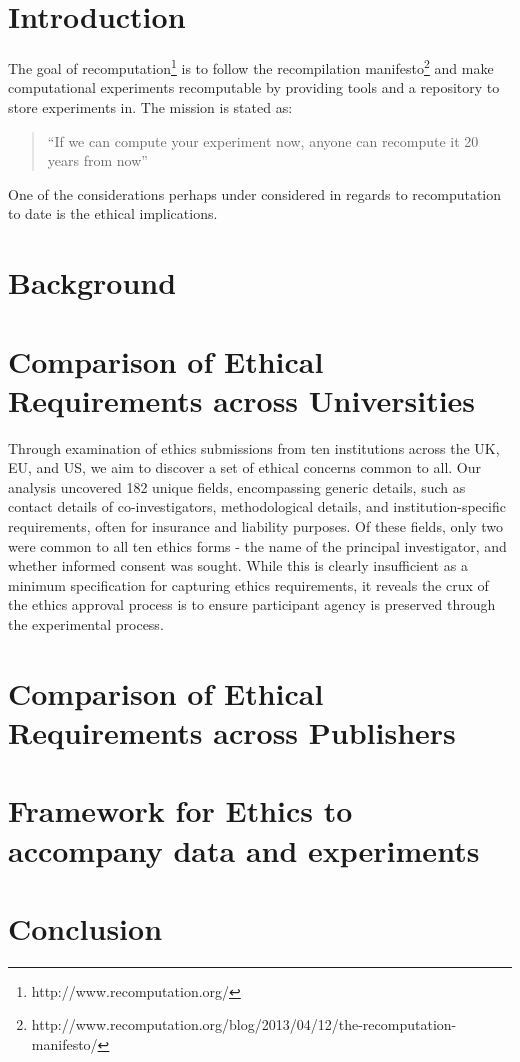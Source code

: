 \documentclass[12pt]{article}
\begin{document}
\maketitle

\section{Introduction}
The goal of recomputation\footnote{http://www.recomputation.org/} is to follow the recompilation manifesto\footnote{http://www.recomputation.org/blog/2013/04/12/the-recomputation-manifesto/} and make computational experiments recomputable by providing tools and a repository to store experiments in. The mission is stated as:
\begin{quote}
``If we can compute your experiment now, anyone can recompute it 20 years from now''
\end{quote}

One of the considerations perhaps under considered in regards to recomputation to date is the ethical implications. 
\section{Background}

\section{Comparison of Ethical Requirements across Universities}

Through examination of ethics submissions from ten institutions across the UK, EU, and US,
we aim to discover a set of ethical concerns common to all. 
Our analysis uncovered 182 unique fields, 
encompassing generic details, such as contact details of co-investigators, methodological
details, and institution-specific requirements, often for insurance and liability purposes.
Of these fields, only two were common to all ten ethics forms - the name of the principal
investigator, and whether informed consent was sought. While this is clearly insufficient
as a minimum specification for capturing ethics requirements, it reveals the crux of the 
ethics approval process is to ensure participant agency is preserved through the experimental process.






\section{Comparison of Ethical Requirements across Publishers}

\section{Framework for Ethics to accompany data and experiments}

\section{Conclusion}
\end{document}
